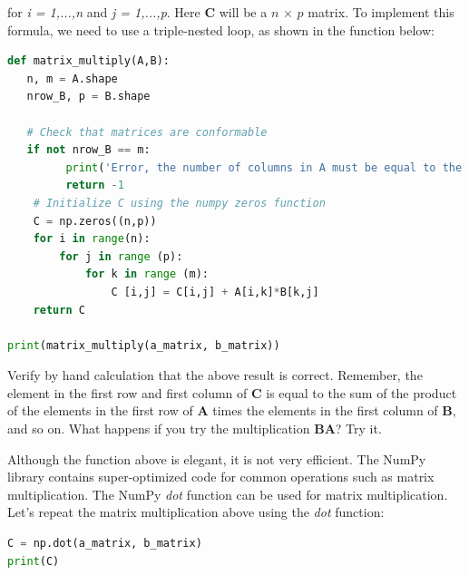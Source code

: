 \documentclass[a4paper , 12pt]{book}
\begin{document}
for \textit{i = 1,...,n} and \textit{j = 1,...,p}. Here \textbf{C} will be a $n$ $\times$ $p$ matrix. To implement this formula, we need to use a triple-nested loop, as shown in the function below:

\begin{center}
\begin{lstlisting}[language=Python, frame=single]
def matrix_multiply(A,B):
   n, m = A.shape
   nrow_B, p = B.shape
   
   # Check that matrices are conformable
   if not nrow_B == m:
         print('Error, the number of columns in A must be equal to the number of rows in B!')
         return -1
    # Initialize C using the numpy zeros function
    C = np.zeros((n,p))
    for i in range(n):
        for j in range (p):
            for k in range (m):
                C [i,j] = C[i,j] + A[i,k]*B[k,j]
    return C
    
print(matrix_multiply(a_matrix, b_matrix))
\end{lstlisting}   
\end{center}

Verify by hand calculation that the above result is correct. Remember, the element in the first row and first column of \textbf{C} is equal to the sum of the product of the elements in the first row of \textbf{A} times the elements in the first column of \textbf{B}, and so on. What happens if you try the multiplication \textbf{BA}? Try it.

Although the function above is elegant, it is not very efficient. The NumPy library contains super-optimized code for common operations such as matrix multiplication. The NumPy \textit{dot} function can be used for matrix multiplication. Let's repeat the matrix multiplication above using the \textit{dot} function:

\begin{center}
\begin{lstlisting}[language=Python, frame=single]
C = np.dot(a_matrix, b_matrix)
print(C)
\end{lstlisting}
\end{center}
\end{document}
